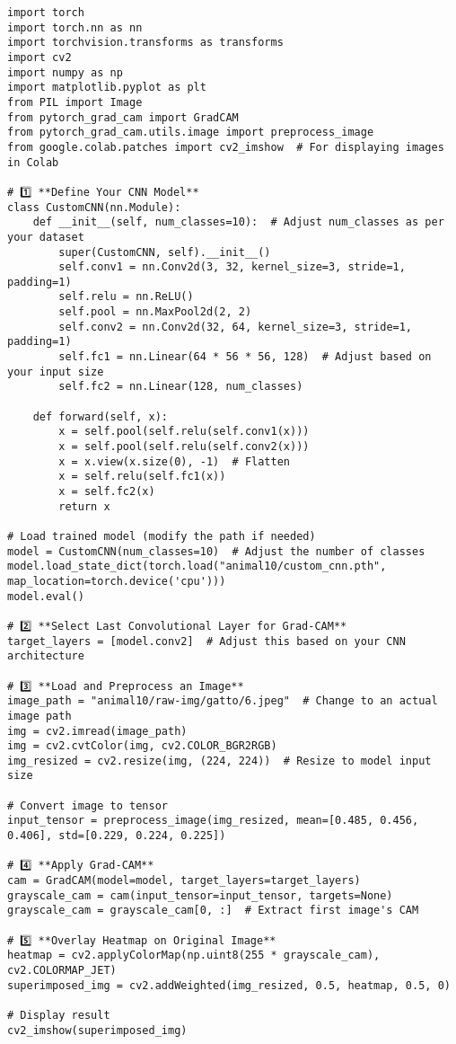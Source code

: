\documentclass{article}
\begin{document}
\begin{verbatim}
import torch
import torch.nn as nn
import torchvision.transforms as transforms
import cv2
import numpy as np
import matplotlib.pyplot as plt
from PIL import Image
from pytorch_grad_cam import GradCAM
from pytorch_grad_cam.utils.image import preprocess_image
from google.colab.patches import cv2_imshow  # For displaying images in Colab

# 1️⃣ **Define Your CNN Model**
class CustomCNN(nn.Module):
    def __init__(self, num_classes=10):  # Adjust num_classes as per your dataset
        super(CustomCNN, self).__init__()
        self.conv1 = nn.Conv2d(3, 32, kernel_size=3, stride=1, padding=1)
        self.relu = nn.ReLU()
        self.pool = nn.MaxPool2d(2, 2)
        self.conv2 = nn.Conv2d(32, 64, kernel_size=3, stride=1, padding=1)
        self.fc1 = nn.Linear(64 * 56 * 56, 128)  # Adjust based on your input size
        self.fc2 = nn.Linear(128, num_classes)

    def forward(self, x):
        x = self.pool(self.relu(self.conv1(x)))
        x = self.pool(self.relu(self.conv2(x)))
        x = x.view(x.size(0), -1)  # Flatten
        x = self.relu(self.fc1(x))
        x = self.fc2(x)
        return x

# Load trained model (modify the path if needed)
model = CustomCNN(num_classes=10)  # Adjust the number of classes
model.load_state_dict(torch.load("animal10/custom_cnn.pth", map_location=torch.device('cpu')))
model.eval()

# 2️⃣ **Select Last Convolutional Layer for Grad-CAM**
target_layers = [model.conv2]  # Adjust this based on your CNN architecture

# 3️⃣ **Load and Preprocess an Image**
image_path = "animal10/raw-img/gatto/6.jpeg"  # Change to an actual image path
img = cv2.imread(image_path)
img = cv2.cvtColor(img, cv2.COLOR_BGR2RGB)
img_resized = cv2.resize(img, (224, 224))  # Resize to model input size

# Convert image to tensor
input_tensor = preprocess_image(img_resized, mean=[0.485, 0.456, 0.406], std=[0.229, 0.224, 0.225])

# 4️⃣ **Apply Grad-CAM**
cam = GradCAM(model=model, target_layers=target_layers)
grayscale_cam = cam(input_tensor=input_tensor, targets=None)
grayscale_cam = grayscale_cam[0, :]  # Extract first image's CAM

# 5️⃣ **Overlay Heatmap on Original Image**
heatmap = cv2.applyColorMap(np.uint8(255 * grayscale_cam), cv2.COLORMAP_JET)
superimposed_img = cv2.addWeighted(img_resized, 0.5, heatmap, 0.5, 0)

# Display result
cv2_imshow(superimposed_img)

\end{verbatim}
\end{document}
